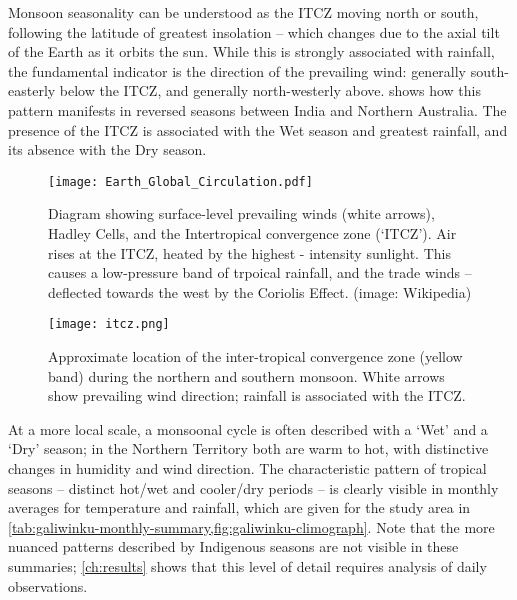 Monsoon seasonality can be understood as the ITCZ moving north or south,
following the latitude of greatest insolation -- which changes due to the
axial tilt of the Earth as it orbits the sun.  While this is strongly
associated with rainfall, the fundamental indicator is the direction of
the prevailing wind: generally south-easterly below the ITCZ, and generally
north-westerly above.   shows how this pattern
manifests in reversed seasons between India and Northern Australia.
The presence of the ITCZ is associated with the Wet season and greatest
rainfall, and its absence with the Dry season.

\begin{figure}[p]
    \centering
    \texttt{[image: Earth\_Global\_Circulation.pdf]}
    \caption[Hadley Cells and trade-winds]{
        Diagram showing surface-level prevailing winds (white arrows),
        Hadley Cells, and the Intertropical convergence zone (`ITCZ').
        Air rises at the ITCZ, heated by the highest - intensity sunlight.
        This causes a low-pressure band of trpoical rainfall, and the
        trade winds -- deflected towards the west by the Coriolis Effect.
        (image: Wikipedia)}
    \label{fig:hadley-cells}
\vspace{1cm}
    \texttt{[image: itcz.png]}
    \caption[ITCZ showing northern and southern monsoon]{
        Approximate location of the inter-tropical convergence zone
        (yellow band) during the northern and southern monsoon.
        White arrows show prevailing wind direction; rainfall is
        associated with the ITCZ.  \citep[image:][]{boos2014}}
    \label{fig:itcz-india-aus}
\end{figure}

At a more local scale, a monsoonal cycle is often described with a `Wet' and a
`Dry' season; in the Northern Territory both are warm to hot, with distinctive
changes in humidity and wind direction.  The characteristic pattern of tropical
seasons -- distinct hot/wet and cooler/dry periods -- is clearly visible in
monthly averages for temperature and rainfall, which are given for the study
area in \cref{tab:galiwinku-monthly-summary,fig:galiwinku-climograph}.
Note that the more nuanced patterns described by Indigenous seasons are not
visible in these summaries; \cref{ch:results} shows that this level of detail
requires analysis of daily observations.




